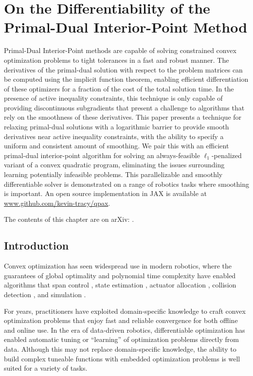 \graphicspath{{qpax/}}


\chapter{On the Differentiability of the \\Primal-Dual Interior-Point Method}
\label{sec:qpax}

Primal-Dual Interior-Point methods are capable of solving constrained convex optimization problems to tight tolerances in a fast and robust manner.
The derivatives of the primal-dual solution with respect to the problem matrices can be computed using the implicit function theorem, enabling efficient differentiation of these optimizers for a fraction of the cost of the total solution time.
In the presence of active inequality constraints, this technique is only capable of providing discontinuous subgradients that present a challenge to algorithms that rely on the smoothness of these derivatives.
This paper presents a technique for relaxing primal-dual solutions with a logarithmic barrier to provide smooth derivatives near active inequality constraints, with the ability to specify a uniform and consistent amount of smoothing.
We pair this with an efficient primal-dual interior-point algorithm for solving an always-feasible $\ell_1$-penalized variant of a convex quadratic program, eliminating the issues surrounding learning potentially infeasible problems.
This parallelizable and smoothly differentiable solver is demonstrated on a range of robotics tasks where smoothing is important. An open source implementation in JAX is available at \url{www.github.com/kevin-tracy/qpax}.

The contents of this chapter are on arXiv: \citet{tracy2024}.
%
%
\section{Introduction}
%
%
Convex optimization has seen widespread use in modern robotics, where the guarantees of global optimality and polynomial time complexity have enabled algorithms that span control \cite{kuindersma2014a,blackmore2016}, state estimation \cite{varin2020,xinjilefu2014}, actuator allocation \cite{tracy2023d,kirchengast2018}, collision detection \cite{gilbert1994,tracy2023b}, and simulation \cite{anitescu2006,pang2021}.

For years, practitioners have exploited domain-specific knowledge to craft convex optimization problems that enjoy fast and reliable convergence for both offline and online use.
In the era of data-driven robotics, differentiable optimization has enabled automatic tuning or ``learning'' of optimization problems directly from data. Although this may not replace domain-specific knowledge, the ability to build complex tuneable functions with embedded optimization problems is well suited for a variety of tasks.

